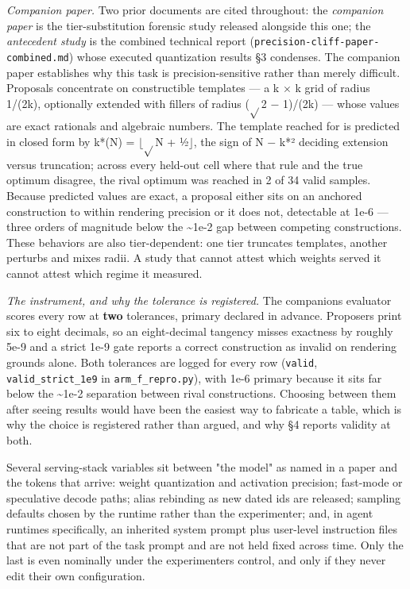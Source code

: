 \emph{Companion paper.} Two prior documents are cited throughout: the \emph{companion paper} is the tier-substitution forensic study released alongside this one; the \emph{antecedent study} is the combined technical report (\texttt{precision-cliff-paper-combined.md}) whose executed quantization results §3 condenses. The companion paper establishes why this task is precision-sensitive rather than merely difficult. Proposals concentrate on constructible templates --- a k \(\times\) k grid of radius 1/(2k), optionally extended with fillers of radius (\(\sqrt{}\)2 \(-\) 1)/(2k) --- whose values are exact rationals and algebraic numbers. The template reached for is predicted in closed form by k*(N) = \(\lfloor\)\(\sqrt{}\)N + ½\(\rfloor\), the sign of N \(-\) k*² deciding extension versus truncation; across every held-out cell where that rule and the true optimum disagree, the rival optimum was reached in 2 of 34 valid samples. Because predicted values are exact, a proposal either sits on an anchored construction to within rendering precision or it does not, detectable at 1e-6 --- three orders of magnitude below the \textasciitilde1e-2 gap between competing constructions. These behaviors are also tier-dependent: one tier truncates templates, another perturbs and mixes radii. A study that cannot attest which weights served it cannot attest which regime it measured.

\emph{The instrument, and why the tolerance is registered.} The companion\textquotesingle s evaluator scores every row at \textbf{two} tolerances, primary declared in advance. Proposers print six to eight decimals, so an eight-decimal tangency misses exactness by roughly 5e-9 and a strict 1e-9 gate reports a correct construction as invalid on rendering grounds alone. Both tolerances are logged for every row (\texttt{valid}, \texttt{valid\_strict\_1e9} in \texttt{arm\_f\_repro.py}), with 1e-6 primary because it sits far below the \textasciitilde1e-2 separation between rival constructions. Choosing between them after seeing results would have been the easiest way to fabricate a table, which is why the choice is registered rather than argued, and why §4 reports validity at both.

Several serving-stack variables sit between "the model" as named in a paper and the tokens that arrive: weight quantization and activation precision; fast-mode or speculative decode paths; alias rebinding as new dated ids are released; sampling defaults chosen by the runtime rather than the experimenter; and, in agent runtimes specifically, an inherited system prompt plus user-level instruction files that are not part of the task prompt and are not held fixed across time. Only the last is even nominally under the experimenter\textquotesingle s control, and only if they never edit their own configuration.

